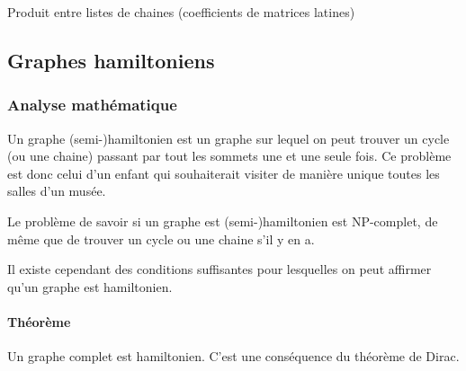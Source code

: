     \begin{algorithm}
      \caption{Produit entre listes de chaines (coefficients de matrices
      latines)}
      \label{alg:prod_chaine}
    \end{algorithm}

\subsection{Graphes hamiltoniens}
  \subsubsection{Analyse mathématique}
    Un graphe (semi-)hamiltonien est un graphe sur lequel on peut
    trouver un cycle (ou une chaine) passant par tout les sommets une et une
    seule fois. Ce problème est donc celui d'un enfant qui souhaiterait visiter
    de manière unique toutes les salles d'un musée.

    Le problème de savoir si un graphe est (semi-)hamiltonien est NP-complet,
    de même que de trouver un cycle ou une chaine s'il y en a.

    Il existe cependant des conditions suffisantes pour lesquelles on peut
    affirmer qu'un graphe est hamiltonien.

    \paragraph{Théorème} Un graphe complet est hamiltonien. C'est une
    conséquence du théorème de Dirac.

